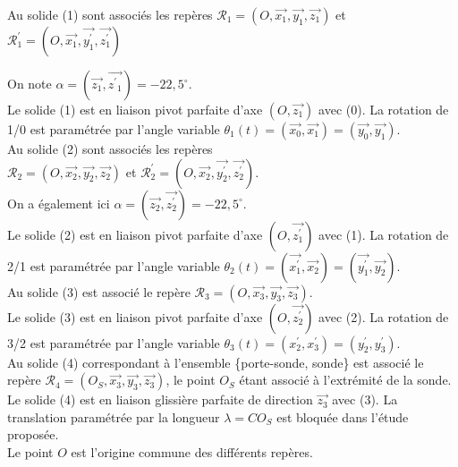 Au solide (1) sont associés les repères $\mathcal{R}_{1}=\left(O, \overrightarrow{x_{1}}, \overrightarrow{y_{1}}, \overrightarrow{z_{1}}\right)$ et 
$\mathcal{R}_{1}^{\prime}=
\left(O, 
\overrightarrow{x_{1}}, 
\overrightarrow{y_{1}^{\prime}}, 
\overrightarrow{z_{1}^{\prime}}
\right)$

%



On note $\alpha=\left(\overrightarrow{z_{1}}, \overrightarrow{z^{\prime}{ }_{1}}\right)=-22,5^{\circ}$. \\
Le solide (1) est en liaison pivot parfaite d'axe $\left(O, \overrightarrow{z_{1}}\right)$ avec (0). La rotation de 1/0 est paramétrée par l'angle variable $\theta_{1}(t)=\left(\overrightarrow{x_{0}}, \overrightarrow{x_{1}}\right)=\left(\overrightarrow{y_{0}}, \overrightarrow{y_{1}}\right)$. \\
Au solide (2) sont associés les repères \\
$\mathcal{R}_{2}=\left(O, \overrightarrow{x_{2}}, \overrightarrow{y_{2}}, \overrightarrow{z_{2}}\right)$ et $\mathcal{R}_{2}^{\prime}=\left(O, \overrightarrow{x_{2}}, \overrightarrow{y_{2}^{\prime}}, \overrightarrow{z_{2}^{\prime}}\right)$. \\
On a également ici $\alpha=\left(\overrightarrow{z_{2}}, \overrightarrow{z_{2}^{\prime}}\right)=-22,5^{\circ}$. \\
Le solide (2) est en liaison pivot parfaite d'axe $\left(O, \overrightarrow{z_{1}^{\prime}}\right)$ avec (1). La rotation de 2/1 est paramétrée par l'angle variable $\theta_{2}(t)=\left(\overrightarrow{x_{1}^{\prime}}, \overrightarrow{x_{2}}\right)=\left(\overrightarrow{y_{1}^{\prime}}, \overrightarrow{y_{2}}\right)$. \\
Au solide (3) est associé le repère $\mathcal{R}_{3}=\left(O, \overrightarrow{x_{3}}, \overrightarrow{y_{3}}, \overrightarrow{z_{3}}\right)$. \\
Le solide (3) est en liaison pivot parfaite d'axe $\left(O, \overrightarrow{z_{2}^{\prime}}\right)$ avec (2). La rotation de 3/2 est paramétrée par l'angle variable $\theta_{3}(t)=\left(x_{2}^{\prime}, x_{3}^{\prime}\right)=\left(y_{2}^{\prime}, y_{3}^{\prime}\right)$. \\
Au solide (4) correspondant à l'ensemble \{porte-sonde, sonde\} est associé le repère $\mathcal{R}_{4}=\left(O_{S}, \overrightarrow{x_{3}}, \overrightarrow{y_{3}}, \overrightarrow{z_{3}}\right)$, le point $O_{S}$ étant associé à l'extrémité de la sonde. Le solide (4) est en liaison glissière parfaite de direction $\overrightarrow{z_{3}}$ avec (3). La translation paramétrée par la longueur $\lambda=C O_{S}$ est bloquée dans l'étude proposée. \\
Le point $O$ est l'origine commune des différents repères. \\

